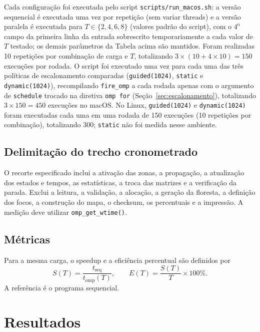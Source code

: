 \documentclass[12pt,a4paper]{article}
\begin{document}
Cada configuração foi executada pelo script \texttt{scripts/run\_macos.sh}:
a versão sequencial é executada uma vez por repetição (sem variar
threads) e a versão paralela é executada para $T\in\{2,4,6,8\}$ (valores
padrão do script), com o $4^{\text{o}}$ campo da primeira linha da
entrada sobrescrito temporariamente a cada valor de $T$ testado; os
demais parâmetros da Tabela acima são mantidos. Foram realizadas 10
repetições por combinação de carga e $T$, totalizando
$3\times(10+4\times10)=150$ execuções por rodada. O script foi executado
uma vez para cada uma das três políticas de escalonamento comparadas
(\texttt{guided(1024)}, \texttt{static} e \texttt{dynamic(1024)}),
recompilando \texttt{fire\_omp} a cada rodada apenas com o argumento de
\texttt{schedule} trocado na diretiva \texttt{omp for}
(Seção~\ref{sec:escalonamento}), totalizando $3\times150=450$ execuções
no macOS. No Linux, \texttt{guided(1024)} e \texttt{dynamic(1024)} foram
executadas cada uma em uma rodada de 150 execuções (10 repetições por
combinação), totalizando 300; \texttt{static} não foi medida nesse
ambiente.

\subsection{Delimitação do trecho cronometrado}

O recorte especificado inclui a ativação das zonas, a propagação, a
atualização dos estados e tempos, as estatísticas, a troca das matrizes e a
verificação da parada. Exclui a leitura, a validação, a alocação, a geração
da floresta, a definição dos focos, a construção do mapa, o checksum, os
percentuais e a impressão. A medição
deve utilizar \texttt{omp\_get\_wtime()}.


\subsection{Métricas}
Para a mesma carga, o speedup e a eficiência percentual são definidos por
\begin{equation}
S(T)=\frac{t_{\mathrm{seq}}}{t_{\mathrm{omp}}(T)},\qquad
E(T)=\frac{S(T)}{T}\times100\%.
\end{equation}
A referência é o programa sequencial. 

\section{Resultados}\label{sec:resultados}
\end{document}

